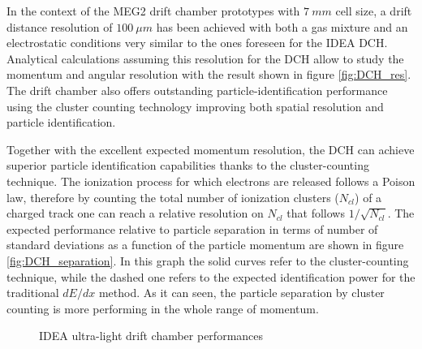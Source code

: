 In the context of the MEG2 drift chamber prototypes \cite{MEG2} with $7\ mm$ cell size, a drift distance resolution of $100\ \mu m$ has been achieved with both a gas mixture and an electrostatic conditions very similar to the ones foreseen for the IDEA DCH.
Analytical calculations assuming this resolution for the DCH allow to study the momentum and angular resolution with the result shown in figure \ref{fig:DCH_res}.
The drift chamber also offers outstanding particle-identification performance using the cluster counting technology improving both spatial resolution and particle identification.

Together with the excellent expected momentum resolution, the DCH can achieve  superior  particle  identification  capabilities  thanks  to  the  cluster-counting  technique. The ionization process for which electrons are released follows a Poison law, therefore by counting the total number of ionization clusters ($N_{cl}$) of a charged track one can reach a relative resolution on $N_{cl}$ that follows $1/\sqrt{N_{cl}}$. The expected performance relative to particle separation in terms of number of standard deviations as a function of the particle momentum are shown in figure \ref{fig:DCH_separation}. In this graph the solid  curves  refer  to  the  cluster-counting  technique,  while  the  dashed  one  refers  to  the expected identification power for the traditional $dE/dx$ method. As it can seen, the particle separation by cluster counting is more performing in the whole range of momentum.

\begin{figure}
	\centering
	 \quad
	\caption{IDEA ultra-light drift chamber performances \cite{FCC-ee_design}}
\end{figure}

